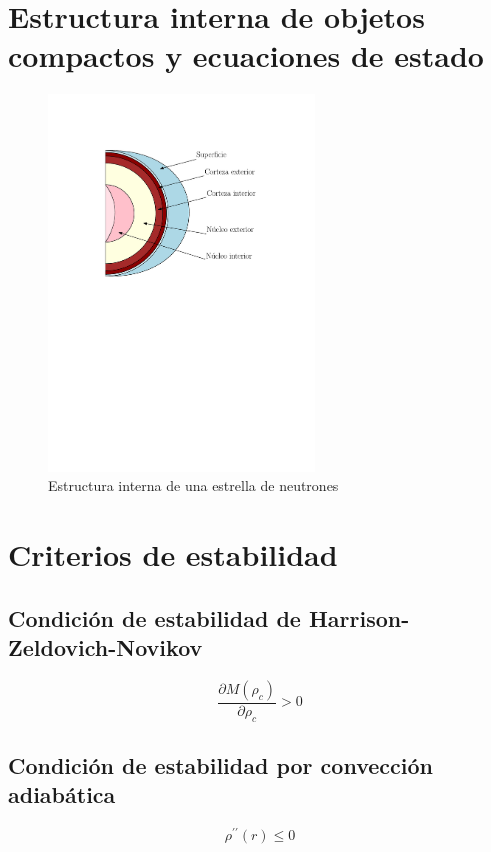 \section{Estructura interna de objetos compactos y ecuaciones de estado}

\begin{figure}[H]
    \centering
    \includegraphics[width=200pt]{figures/neutronstar.pdf}
    \caption{Estructura interna de una estrella de neutrones}
    \label{NSS}
\end{figure}

\section{Criterios de estabilidad}

\subsection{Condición de estabilidad de Harrison-Zeldovich-Novikov}

\begin{equation}
    \frac { \partial M \left( \rho _ { c } \right) } { \partial \rho _ { c } } > 0
\end{equation}


\subsection{Condición de estabilidad por convección adiabática}

\begin{equation}
    \rho ^ { \prime \prime } ( r ) \leq 0
\end{equation}

